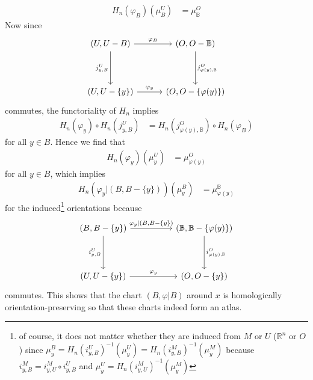 \begin{prf}
\begin{enumerate}
\begin{align*}
  H_{n}(\varphi_{B})(\mu_{B}^{U})
  &=
  \mu_{\mathbb{B}}^{O}
\end{align*}
Now since
\begin{equation*}
\begin{tikzcd}[row sep=4em,column sep=3em]
  (U,U - B)
  \ar{r}{\varphi_{B}}
  \ar{d}[swap]{j_{y,B}^{U}}
  &
  (O,O - \mathbb{B})
  \ar{d}{j_{\varphi(y),\mathbb{B}}^{O}}
  \\
  (U,U - \lbrace y \rbrace)
  \ar{r}{\varphi_{y}}
  &
  (O,O - \lbrace \varphi(y) \rbrace)
\end{tikzcd}
\end{equation*}
commutes, the functoriality of $H_{n}$ implies
\begin{align}
\label{chartcomm}
  H_{n}(\varphi_{y})
  \circ
  H_{n}(j_{y,B}^{U})
  &=
  H_{n}(j_{\varphi(y),\mathbb{B}}^{O})
  \circ
  H_{n}(\varphi_{B})
\end{align}
for all $y \in B$. Hence we find that
\begin{align*}
  H_{n}(\varphi_{y})(\mu_{y}^{U})
  &=
  \mu_{\varphi(y)}^{O}
\end{align*}
for all $y \in B$, which implies
\begin{align*}
  H_{n}
  \left(
    \varphi_{y}\vert(B,B - \lbrace y \rbrace)
  \right)
  \left(
    \mu_{y}^{B}
  \right)
  &=
  \mu_{\varphi(y)}^{\mathbb{B}}
\end{align*}
for the induced\footnote{of course, it does not matter whether they are induced from $M$ or $U$ ($\mathbb{R}^{n}$ or $O$) since $\mu_{y}^{B} = H_{n}(i_{y,B}^{U})^{-1}(\mu_{y}^{U}) = H_{n}(i_{y,B}^{M})^{-1}(\mu_{y}^{M})$ because $i_{y,B}^{M} = i_{y,U}^{M} \circ i_{y,B}^{U}$ and $\mu_{y}^{U} = H_{n}(i_{y,U}^{M})^{-1}(\mu_{y}^{M})$} orientations because
\begin{equation*}
\begin{tikzcd}[row sep=4em,column sep=5em]
  (B,B - \lbrace y \rbrace)
  \ar{r}{\varphi_{y}\vert(B,B - \lbrace y \rbrace)}
  \ar{d}[swap]{i_{y,B}^{U}}
  &
  (\mathbb{B},\mathbb{B} - \lbrace \varphi(y) \rbrace)
  \ar{d}{i_{\varphi(y),\mathbb{B}}^{O}}
  \\
  (U,U - \lbrace y \rbrace)
  \ar{r}{\varphi_{y}}
  &
  (O,O - \lbrace y \rbrace)
\end{tikzcd}
\end{equation*}
commutes. This shows that the chart $(B,\varphi\vert B)$ around $x$ is homologically orientation-preserving so that these charts indeed form an atlas.
\\

\end{enumerate}
\end{prf}

